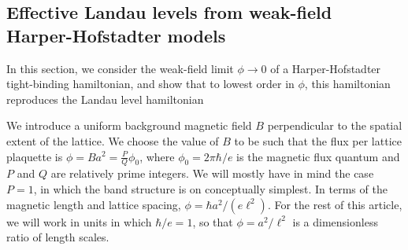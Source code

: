\documentclass[aps,prb,twocolumn,letterpaper,twoside,nobalancelastpage,groupedaddress,amsmath,amssymb,floatfix,citeautoscript]{revtex4-1}
\begin{document}


\subsection{Effective Landau levels from weak-field Harper-Hofstadter models}
\label{landau-level-limit}
In this section, we consider the weak-field limit $\phi \rightarrow 0$ of a Harper-Hofstadter tight-binding hamiltonian, and show that to lowest order in $\phi$, this hamiltonian reproduces the Landau level hamiltonian

We introduce a uniform background magnetic field $B$ perpendicular to the spatial extent of the lattice. We choose the value of $B$ to be such that the flux per lattice plaquette is $\phi = Ba^2 = \frac{P}{Q}\phi_0$, where $\phi_0 = 2\pi \hbar /e$ is the magnetic flux quantum and $P$ and $Q$ are relatively prime integers. We will mostly have in mind the case $P =1$, in which the band structure is on conceptually simplest.\cite{Harper:2014vi} In terms of the magnetic length and lattice spacing, $\phi = \hbar a^2/(e \ell^2)$. For the rest of this article, we will work in units in which $\hbar/e= 1$, so that $\phi =a^2/\ell^2$ is a dimensionless ratio of length scales.
\end{document}
